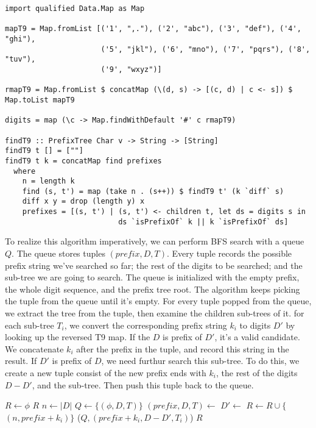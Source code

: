 \documentclass[b5paper]{article}
\begin{document}
\lstset{language=Haskell}
\begin{lstlisting}
import qualified Data.Map as Map

mapT9 = Map.fromList [('1', ",."), ('2', "abc"), ('3', "def"), ('4', "ghi"),
                      ('5', "jkl"), ('6', "mno"), ('7', "pqrs"), ('8', "tuv"),
                      ('9', "wxyz")]

rmapT9 = Map.fromList $ concatMap (\(d, s) -> [(c, d) | c <- s]) $ Map.toList mapT9

digits = map (\c -> Map.findWithDefault '#' c rmapT9)

findT9 :: PrefixTree Char v -> String -> [String]
findT9 t [] = [""]
findT9 t k = concatMap find prefixes
  where
    n = length k
    find (s, t') = map (take n . (s++)) $ findT9 t' (k `diff` s)
    diff x y = drop (length y) x
    prefixes = [(s, t') | (s, t') <- children t, let ds = digits s in
                          ds `isPrefixOf` k || k `isPrefixOf` ds]
\end{lstlisting}

To realize this algorithm imperatively, we can perform BFS search with a queue $Q$.
The queue stores tuples $(prefix, D, T)$. Every tuple records the possible
prefix string we've searched so far; the rest of the digits to be searched;
and the sub-tree we are going to search. The queue is initialized with the
empty prefix, the whole digit sequence, and the prefix tree root. The algorithm
keeps picking the tuple from the queue until it's empty. For every tuple
popped from the queue, we extract the tree from the tuple, then examine the
children sub-trees of it. for each sub-tree $T_i$, we convert the corresponding
prefix string $k_i$ to digits $D'$ by looking up the reversed T9 map. If the
$D$ is prefix of $D'$, it's a valid candidate. We concatenate $k_i$ after
the prefix in the tuple, and record this string in the result. If $D'$ is
prefix of $D$, we need furthur search this sub-tree. To do this, we
create a new tuple consist of the new prefix ends with $k_i$, the rest of
the digits $D-D'$, and the sub-tree. Then push this tuple back to the queue.

\begin{algorithmic}[1]
  \State $R \gets \phi$
    \State \Return $R$
  \EndIf
  \State $n \gets |D|$
  \State $Q \gets \{(\phi, D, T)\}$
    \State $(prefix, D, T) \gets$ 
      \State $D' \gets$ 
       
        \State $R \gets R \cup \{$  $(n, prefix + k_i) \}$ 
        \State {}($Q, (prefix + k_i, D - D', T_i)$)
      \EndIf
    \EndFor
  \EndWhile
  \State \Return $R$
\EndFunction
\end{algorithmic}
\end{document}

